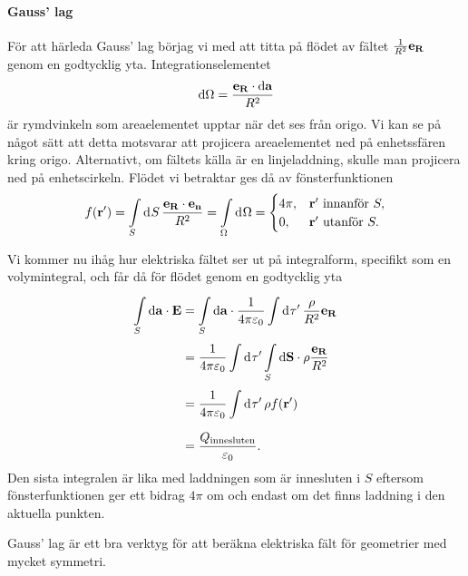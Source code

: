 \paragraph{Gauss' lag}
För att härleda Gauss' lag börjag vi med att titta på flödet av fältet $\frac{1}{R^{2}}\vb{e}_{\vb{R}}$ genom en godtycklig yta. Integrationselementet
\begin{align*}
	\dd{\Omega} = \frac{\vb{e}_{\vb{R}}\cdot\vb{\dd{a}}}{R^{2}}
\end{align*}
är rymdvinkeln som areaelementet upptar när det ses från origo. Vi kan se på något sätt att detta motsvarar att projicera areaelementet ned på enhetssfären kring origo. Alternativt, om fältets källa är en linjeladdning, skulle man projicera ned på enhetscirkeln. Flödet vi betraktar ges då av fönsterfunktionen
\begin{align*}
	f(\vb{r}') = \int\limits_{S}^{}\dd[]{S}\frac{\vb{e}_{\vb{R}}\cdot\vb{e}_{\vb{n}}}{R^{2}} = \int\limits_{\Omega}^{}\dd[]{\Omega} =
	\begin{cases}
		4\pi, &\vb{r}'\text{ innanför }S, \\
		0,    &\vb{r}'\text{ utanför }S.
	\end{cases}
\end{align*}

Vi kommer nu ihåg hur elektriska fältet ser ut på integralform, specifikt som en volymintegral, och får då för flödet genom en godtycklig yta
\begin{align*}
	\int\limits_{S}^{}\dd{\vb{a}}\cdot \vb{E} &= \int\limits_{S}^{}\dd{\vb{a}}\cdot \frac{1}{4\pi\varepsilon_{0}}\int\limits_{}^{}\dd[]{\tau'}\frac{\rho}{R^{2}}\vb{e}_{\vb{R}} \\
	                      &= \frac{1}{4\pi\varepsilon_{0}}\int\limits_{}^{}\dd[]{\tau'}\int\limits_{S}^{}\dd{\vb{S}}\cdot \rho\frac{\vb{e}_{\vb{R}}}{R^{2}} \\
	                      &= \frac{1}{4\pi\varepsilon_{0}}\int\limits_{}^{}\dd[]{\tau'}\rho f(\vb{r}') \\
	                      &= \frac{Q_{\text{innesluten}}}{\varepsilon_{0}}.
\end{align*}
Den sista integralen är lika med laddningen som är innesluten i $S$ eftersom fönsterfunktionen ger ett bidrag $4\pi$ om och endast om det finns laddning i den aktuella punkten.

Gauss' lag är ett bra verktyg för att beräkna elektriska fält för geometrier med mycket symmetri.

